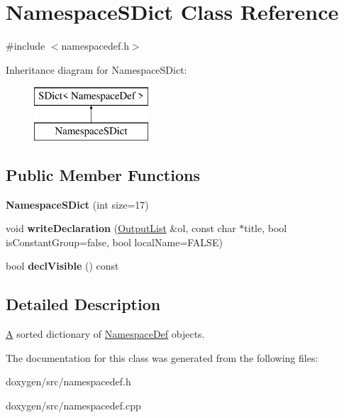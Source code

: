 \hypertarget{class_namespace_s_dict}{}\section{Namespace\+S\+Dict Class Reference}
\label{class_namespace_s_dict}


{\ttfamily \#include $<$namespacedef.\+h$>$}

Inheritance diagram for Namespace\+S\+Dict\+:\begin{figure}[H]
\begin{center}
\leavevmode
\includegraphics[height=2.000000cm]{class_namespace_s_dict}
\end{center}
\end{figure}
\subsection*{Public Member Functions}
\begin{DoxyCompactItemize}
\item 
\mbox{\label{class_namespace_s_dict_aca50aebc3e81c2baaae42f80b1195acb}} 
{\bfseries Namespace\+S\+Dict} (int size=17)
\item 
\mbox{\label{class_namespace_s_dict_a4db0950fbb99b10f4656d385961746ca}} 
void {\bfseries write\+Declaration} (\mbox{\hyperlink{class_output_list}{Output\+List}} \&ol, const char $\ast$title, bool is\+Constant\+Group=false, bool local\+Name=F\+A\+L\+SE)
\item 
\mbox{\label{class_namespace_s_dict_a4c73deb377eeebea39438df0158f34d5}} 
bool {\bfseries decl\+Visible} () const
\end{DoxyCompactItemize}


\subsection{Detailed Description}
\mbox{\hyperlink{class_a}{A}} sorted dictionary of \mbox{\hyperlink{class_namespace_def}{Namespace\+Def}} objects. 

The documentation for this class was generated from the following files\+:\begin{DoxyCompactItemize}
\item 
doxygen/src/namespacedef.\+h\item 
doxygen/src/namespacedef.\+cpp\end{DoxyCompactItemize}
